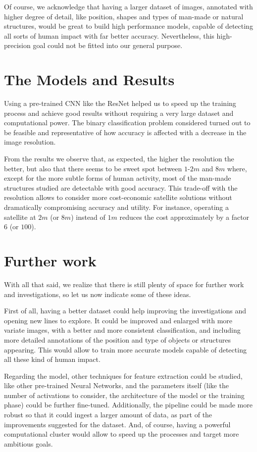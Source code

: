 Of course, we acknowledge that having a larger dataset of images, annotated with higher degree of detail, like position, shapes and types of man-made or natural structures, would be great to build high performance models, capable of detecting all sorts of human impact with far better accuracy. Nevertheless, this high-precision goal could not be fitted into our general purpose.

\section{The Models and Results}

Using a pre-trained CNN like the ResNet helped us to speed up the training process and achieve good results without requiring a very large dataset and computational power. The binary classification problem considered turned out to be feasible and representative of how accuracy is affected with a decrease in the image resolution. 

From the results we observe that, as expected, the higher the resolution the better, but also that there seems to be sweet spot between $1$-$2m$ and $8m$ where, except for the more subtle forms of human activity, most of the man-made structures studied are detectable with good accuracy. This trade-off with the resolution allows to consider more cost-economic satellite solutions without dramatically compromising accuracy and utility. For instance, operating a satellite at $2m$ (or $8m$) instead of $1m$ reduces the cost approximately by a factor 6 (or $100$).

\section{Further work}

With all that said, we realize that there is still plenty of space for further work and investigations, so let us now indicate some of these ideas.

First of all, having a better dataset could help improving the investigations and opening new lines to explore. It could be improved and enlarged with more variate images, with a better and more consistent classification, and including more detailed annotations of the position and type of objects or structures appearing. This would allow to train more accurate models capable of detecting all these kind of human impact.

Regarding the model, other techniques for feature extraction could be studied, like other pre-trained Neural Networks, and the parameters itself (like the number of activations to consider, the architecture of the model or the training phase) could be further fine-tuned. Additionally, the pipeline could be made more robust so that it could ingest a larger amount of data, as part of the improvements suggested for the dataset. And, of course, having a powerful computational cluster would allow to speed up the processes and target more ambitious goals.

